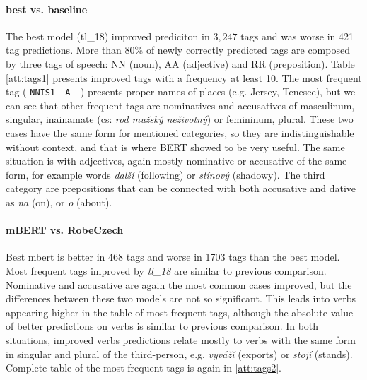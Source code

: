 \paragraph{best vs. baseline}
The best model (tl\_18) improved prediciton in $3,247$ tags and was worse in 421 tag predictions. More than 80\% of newly correctly predicted tags are composed by three tags of speech: NN (noun), AA (adjective) and RR (preposition). Table \ref{att:tags1} presents improved tags with a frequency at least 10. The most frequent tag ( \texttt{NNIS1-----A----}) presents proper names of places (e.g. Jersey, Tenesee), but we can see that other frequent tags are nominatives and accusatives of masculinum, singular,  inainamate (cs: \textit{rod mužský neživotný}) or femininum, plural. These two cases have the same form for mentioned categories, so they are indistinguishable without context, and that is where BERT showed to be very useful. The same situation is with adjectives, again mostly nominative or accusative of the same form, for example words \textit{další} (following) or \textit{stínový} (shadowy). The third category are prepositions that can be connected with both accusative and dative as \textit{na} (on), or \textit{o} (about).


\paragraph{mBERT vs. RobeCzech}
Best mbert is better in 468 tags and worse in 1703 tags than the best model. Most frequent tags improved by \textit{tl\_18} are similar to previous comparison. Nominative and accusative are again the most common cases improved, but the differences between these two models are not so significant. This leads into verbs appearing higher in the table of most frequent tags, although the absolute value of better predictions on verbs is similar to previous comparison. In both situations, improved verbs predictions relate mostly to verbs with the same form in singular and plural of the third-person, e.g. \textit{vyváží} (exports) or \textit{stojí} (stands). Complete table of the most frequent tags is again in \ref{att:tags2}.


